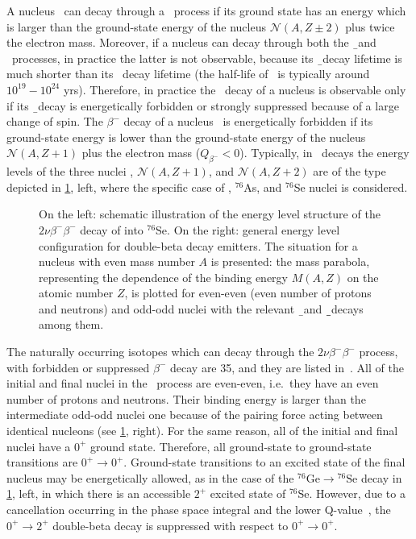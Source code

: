 A nucleus \NAZ\ can decay through a \nnbb\ process if its ground state has an
energy which is larger than the ground-state energy of the nucleus
$\mathcal{N}(A,Z\pm2)$ plus twice the electron mass. Moreover, if a nucleus can
decay through both the \b\ and \nnbb\ processes, in practice the latter is not
observable, because its \b\ decay lifetime is much shorter than its \nnbb\
decay lifetime (the half-life of \nnbb\ is typically around $10^{19}-10^{24}$
yrs). Therefore, in practice the \nnbb\ decay of a nucleus is observable only
if its \b\ decay is energetically forbidden or strongly suppressed because of a
large change of spin. The $\beta^-$ decay of a nucleus \NAZ\ is energetically
forbidden if its ground-state energy is lower than the ground-state energy of
the nucleus $\mathcal{N}(A,Z+1)$ plus the electron mass ($Q_{\beta^{-}} < 0$).
Typically, in \nnbbm\ decays the energy levels of the three nuclei \NAZ,
$\mathcal{N}(A,Z+1)$, and $\mathcal{N}(A,Z+2)$ are of the type depicted in
\cref{fig:nbb:gesixlevels}, left, where the specific case of \gesix,
$^{76}$As, and $^{76}$Se nuclei is considered.

\begin{figure}
  \centering
  \caption{%
    On the left: schematic illustration of the energy level structure of the
    $2\nu\beta^-\beta^-$ decay of \gesix into $^{76}$Se. On the right: general
    energy level configuration for double-beta decay emitters.  The situation
    for a nucleus with even mass number $A$ is presented: the mass parabola,
    representing the dependence of the binding energy $M(A,Z)$ on the atomic
    number $Z$, is plotted for even-even (even number of protons and neutrons)
    and odd-odd nuclei with the relevant \b\ and \b\b\ decays among them.
  }\label{fig:nbb:gesixlevels}
\end{figure}

\marginnote{$2\nu\beta^-\beta^-$}
The naturally occurring isotopes which can decay through the
$2\nu\beta^-\beta^-$ process, with forbidden or suppressed $\beta^-$ decay are
35, and they are listed in~\cite{Giunti2007}. All of the initial and final
nuclei in the \nnbbm\ process are even-even, i.e.~they have an
even number of protons and neutrons. Their binding energy is larger than the
intermediate odd-odd nuclei one because of the pairing force acting between
identical nucleons (see \cref{fig:nbb:gesixlevels}, right). For the same reason,
all of the initial and final nuclei have a $0^+$ ground state.  Therefore, all
ground-state to ground-state transitions are $0^+\rightarrow0^+$. Ground-state
transitions to an excited state of the final nucleus may be energetically
allowed, as in the case of the $^{76}\text{Ge} \rightarrow {^{76}\text{Se}}$ decay in
\cref{fig:nbb:gesixlevels}, left, in which there is an accessible $2^+$ excited
state of $^{76}$Se. However, due to a cancellation occurring in the phase
space integral and the lower Q-value~\cite{Tomoda1991}, the
$0^+\rightarrow2^+$ double-beta decay is suppressed with respect to
$0^+\rightarrow0^+$.

